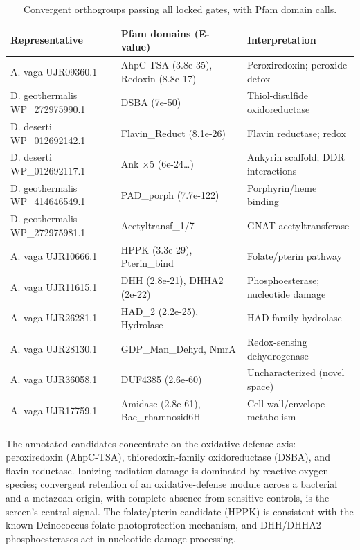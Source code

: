 \documentclass[12pt,a4paper]{article}
\begin{document}
\begin{table}[h]
\centering\small
\caption{Convergent orthogroups passing all locked gates, with Pfam domain calls.}
\begin{tabular}{lll}
\hline\hline
Representative & Pfam domains (E-value) & Interpretation \\
\hline
A. vaga UJR09360.1 & AhpC-TSA (3.8e-35), Redoxin (8.8e-17) & Peroxiredoxin; peroxide detox \\
D. geothermalis WP\_272975990.1 & DSBA (7e-50) & Thiol-disulfide oxidoreductase \\
D. deserti WP\_012692142.1 & Flavin\_Reduct (8.1e-26) & Flavin reductase; redox \\
D. deserti WP\_012692117.1 & Ank $\times$5 (6e-24\ldots) & Ankyrin scaffold; DDR interactions \\
D. geothermalis WP\_414646549.1 & PAD\_porph (7.7e-122) & Porphyrin/heme binding \\
D. geothermalis WP\_272975981.1 & Acetyltransf\_1/7 & GNAT acetyltransferase \\
A. vaga UJR10666.1 & HPPK (3.3e-29), Pterin\_bind & Folate/pterin pathway \\
A. vaga UJR11615.1 & DHH (2.8e-21), DHHA2 (2e-22) & Phosphoesterase; nucleotide damage \\
A. vaga UJR26281.1 & HAD\_2 (2.2e-25), Hydrolase & HAD-family hydrolase \\
A. vaga UJR28130.1 & GDP\_Man\_Dehyd, NmrA & Redox-sensing dehydrogenase \\
A. vaga UJR36058.1 & DUF4385 (2.6e-60) & Uncharacterized (novel space) \\
A. vaga UJR17759.1 & Amidase (2.8e-61), Bac\_rhamnosid6H & Cell-wall/envelope metabolism \\
\hline\hline
\end{tabular}
\end{table}

The annotated candidates concentrate on the oxidative-defense axis: peroxiredoxin (AhpC-TSA), thioredoxin-family oxidoreductase (DSBA), and flavin reductase. Ionizing-radiation damage is dominated by reactive oxygen species; convergent retention of an oxidative-defense module across a bacterial and a metazoan origin, with complete absence from sensitive controls, is the screen's central signal. The folate/pterin candidate (HPPK) is consistent with the known Deinococcus folate-photoprotection mechanism, and DHH/DHHA2 phosphoesterases act in nucleotide-damage processing.
\end{document}
